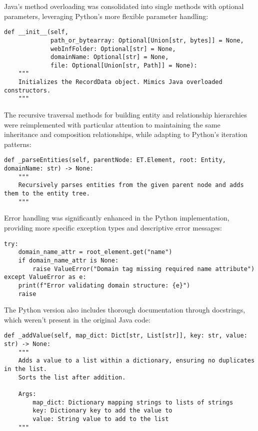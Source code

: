 \documentclass[12pt,a4paper]{article}
\begin{document}
Java's method overloading was consolidated into single methods with optional parameters, leveraging Python's more flexible parameter handling:

\begin{verbatim}
def __init__(self,
             path_or_bytearray: Optional[Union[str, bytes]] = None,
             webInfFolder: Optional[str] = None,
             domainName: Optional[str] = None,
             file: Optional[Union[str, Path]] = None):
    """
    Initializes the RecordData object. Mimics Java overloaded constructors.
    """
\end{verbatim}

The recursive traversal methods for building entity and relationship hierarchies were reimplemented with particular attention to maintaining the same inheritance and composition relationships, while adapting to Python's iteration patterns:

\begin{verbatim}
def _parseEntities(self, parentNode: ET.Element, root: Entity, domainName: str) -> None:
    """
    Recursively parses entities from the given parent node and adds them to the entity tree.
    """
\end{verbatim}

Error handling was significantly enhanced in the Python implementation, providing more specific exception types and descriptive error messages:

\begin{verbatim}
try:
    domain_name_attr = root_element.get("name")
    if domain_name_attr is None:
        raise ValueError("Domain tag missing required name attribute")
except ValueError as e:
    print(f"Error validating domain structure: {e}")
    raise
\end{verbatim}

The Python version also includes thorough documentation through docstrings, which weren't present in the original Java code:

\begin{verbatim}
def _addValue(self, map_dict: Dict[str, List[str]], key: str, value: str) -> None:
    """
    Adds a value to a list within a dictionary, ensuring no duplicates in the list.
    Sorts the list after addition.
    
    Args:
        map_dict: Dictionary mapping strings to lists of strings
        key: Dictionary key to add the value to
        value: String value to add to the list
    """
\end{verbatim}
\end{document}
